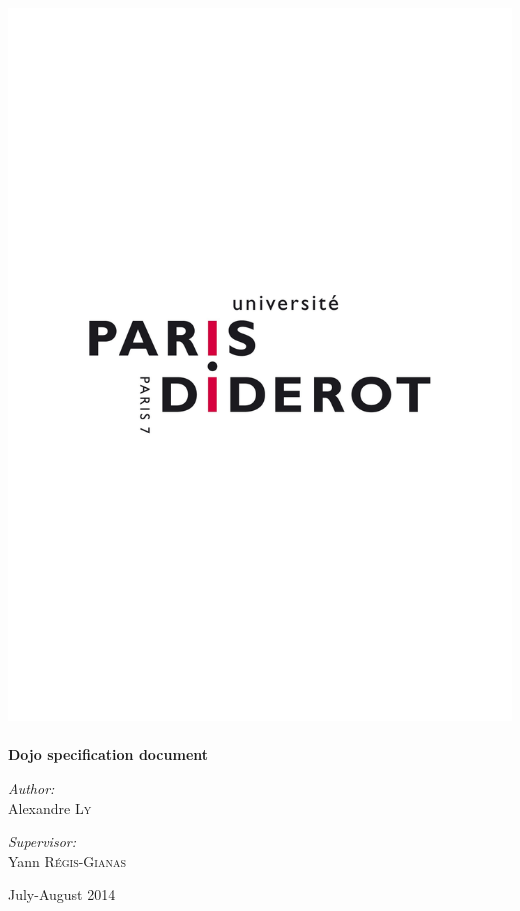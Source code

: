 \begin{titlepage}
\begin{center}

\includegraphics[width=\textwidth, trim=1cm 10cm 1cm 10cm]{./title/logo-paris-diderot}~\\[1cm]


{ \huge \bfseries Dojo specification document\\[0.4cm] }
\vfill


\begin{minipage}{0.4\textwidth}
\begin{flushleft} \large
\emph{Author:}\\
Alexandre \textsc{Ly}
\end{flushleft}
\end{minipage}
\begin{minipage}{0.4\textwidth}
\begin{flushright} \large
\emph{Supervisor:} \\
Yann \textsc{R\'{e}gis-Gianas}
\end{flushright}
\end{minipage}

\vfill

{\large July-August 2014}

\end{center}
\end{titlepage}